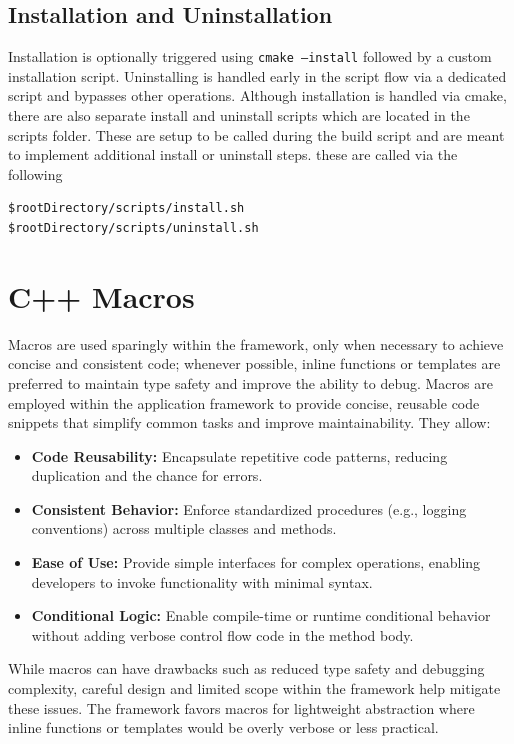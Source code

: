 \subsection{Installation and Uninstallation}

Installation is optionally triggered using \texttt{cmake --install} followed by a custom installation script. Uninstalling is handled early in the script flow via a dedicated script and bypasses other operations. Although installation is handled via cmake, there are also separate install and uninstall scripts which are located in the scripts folder. These are setup to be called during the build script and are meant to implement additional install or uninstall steps. these are called via the following

\begin{lstlisting}[style=shellstyle]
$rootDirectory/scripts/install.sh
$rootDirectory/scripts/uninstall.sh
\end{lstlisting}










\section{C++ Macros}\label{section:cpp_macros}
Macros are used sparingly within the framework, only when necessary to achieve concise and consistent code; whenever possible, inline functions or templates are preferred to maintain type safety and improve the ability to debug. Macros are employed within the application framework to provide concise, reusable code snippets that simplify common tasks and improve maintainability. They allow:
\begin{itemize}\itemsep0em
    \item \textbf{Code Reusability:} Encapsulate repetitive code patterns, reducing duplication and the chance for errors.
    \item \textbf{Consistent Behavior:} Enforce standardized procedures (e.g., logging conventions) across multiple classes and methods.
    \item \textbf{Ease of Use:} Provide simple interfaces for complex operations, enabling developers to invoke functionality with minimal syntax.
    \item \textbf{Conditional Logic:} Enable compile-time or runtime conditional behavior without adding verbose control flow code in the method body.
\end{itemize}
While macros can have drawbacks such as reduced type safety and debugging complexity, careful design and limited scope within the framework help mitigate these issues. The framework favors macros for lightweight abstraction where inline functions or templates would be overly verbose or less practical.
















